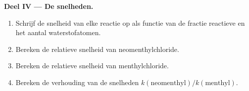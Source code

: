 \begin{problem}
\medskip
\noindent\textbf{Deel IV --- De snelheden.}
\begin{enumerate}[resume]
  \item Schrijf de snelheid van elke reactie op als functie van de fractie
        reactieve  en het aantal  waterstofatomen.
  \item Bereken de relatieve snelheid van neomenthylchloride.
  \item Bereken de relatieve snelheid van menthylchloride.
  \item Bereken de verhouding van de snelheden
        $k(\text{neomenthyl})/k(\text{menthyl})$.
\end{enumerate}
\end{problem}
